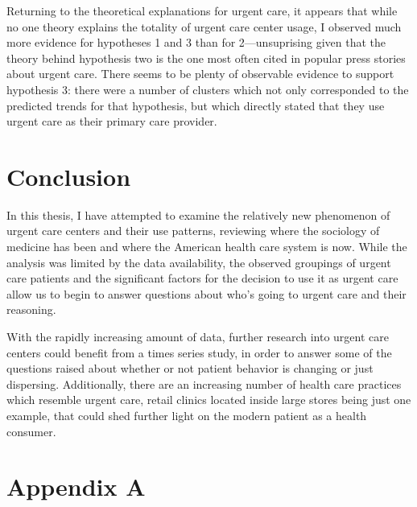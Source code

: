 \documentclass[12pt,twoside]{reedthesis}
\begin{document}
  \doublespacing
  Returning to the theoretical explanations for urgent care, it appears
  that while no one theory explains the totality of urgent care center
  usage, I observed much more evidence for hypotheses 1 and 3 than for
  2---unsuprising given that the theory behind hypothesis two is the one
  most often cited in popular press stories about urgent care. There seems
  to be plenty of observable evidence to support hypothesis 3: there were
  a number of clusters which not only corresponded to the predicted trends
  for that hypothesis, but which directly stated that they use urgent care
  as their primary care provider.
  
  \chapter*{Conclusion}\label{conclusion}
  
  \setcounter{chapter}{6} \setcounter{section}{0} \doublespacing
  
  In this thesis, I have attempted to examine the relatively new
  phenomenon of urgent care centers and their use patterns, reviewing
  where the sociology of medicine has been and where the American health
  care system is now. While the analysis was limited by the data
  availability, the observed groupings of urgent care patients and the
  significant factors for the decision to use it as urgent care allow us
  to begin to answer questions about who's going to urgent care and their
  reasoning.
  
  With the rapidly increasing amount of data, further research into urgent
  care centers could benefit from a times series study, in order to answer
  some of the questions raised about whether or not patient behavior is
  changing or just dispersing. Additionally, there are an increasing
  number of health care practices which resemble urgent care, retail
  clinics located inside large stores being just one example, that could
  shed further light on the modern patient as a health consumer.
  
  \chapter*{Appendix A}\label{appendix-a}
  
  \newpage
  
  \doublespacing
  
  \singlespacing
  
\end{document}
